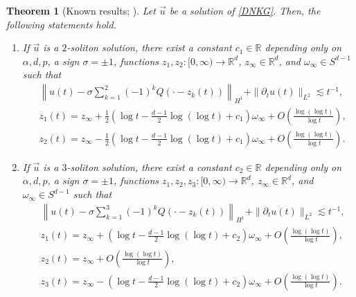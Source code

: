 \documentclass[10pt,a4paper]{amsart}
\newtheorem{theorem}{Theorem}[section]
\numberwithin{equation}{section}
\begin{document}
\begin{theorem}[Known results; \cite{CD,CMYZ,I2,I3}]\label{previoustheorem}
Let $\vec{u}$ be a solution of \eqref{DNKG}. Then, the following statements hold.
\begin{enumerate}
\item If $\vec{u}$ is a $2$-soliton solution, there exist a constant $c_1\in \mathbb{R}$ depending only on $\alpha,d,p$, a sign $\sigma=\pm 1$, functions $z_1,z_2:[0,\infty)\to\mathbb{R}^d$, $z_{\infty}\in \mathbb{R}^d$, and $\omega_{\infty}\in S^{d-1}$ such that
\begin{align*}
&\left\| u(t)-\sigma \sum_{k=1}^2 (-1)^kQ(\cdot-z_k(t))\right\|_{H^1}+\|{\partial}_tu(t)\|_{L^2}\lesssim t^{-1},
\\
&z_1(t)=z_{\infty}+\frac{1}{2}\left(\log{t}-\frac{d-1}{2}\log{(\log{t})}+c_1\right)\omega_{\infty}+O\left(\frac{\log{(\log{t})}}{\log{t}}\right),
\\
&z_2(t)=z_{\infty}-\frac{1}{2}\left(\log{t}-\frac{d-1}{2}\log{(\log{t})}+c_1\right)\omega_{\infty}+O\left(\frac{\log{(\log{t})}}{\log{t}}\right).
\end{align*}

\item If $\vec{u}$ is a $3$-soliton solution, there exist a constant $c_2\in \mathbb{R}$ depending only on $\alpha,d,p$, a sign $\sigma=\pm 1$, functions $z_1,z_2,z_3:[0,\infty)\to\mathbb{R}^d$, $z_{\infty}\in \mathbb{R}^d$, and $\omega_{\infty}\in S^{d-1}$ such that
\begin{align*}
&\left\| u(t)-\sigma \sum_{k=1}^3 (-1)^kQ(\cdot-z_k(t))\right\|_{H^1}+\|{\partial}_tu(t)\|_{L^2}\lesssim t^{-1},
\\
&z_1(t)=z_{\infty}+\left(\log{t}-\frac{d-1}{2}\log{(\log{t})}+c_2\right)\omega_{\infty}+O\left(\frac{\log{(\log{t})}}{\log{t}}\right),
\\
&z_2(t)=z_{\infty}+O\left(\frac{\log{(\log{t})}}{\log{t}}\right),
\\
&z_3(t)=z_{\infty}-\left(\log{t}-\frac{d-1}{2}\log{(\log{t})}+c_2\right)\omega_{\infty}+O\left(\frac{\log{(\log{t})}}{\log{t}}\right).
\end{align*}


\end{enumerate}
\end{theorem}
\end{document}
